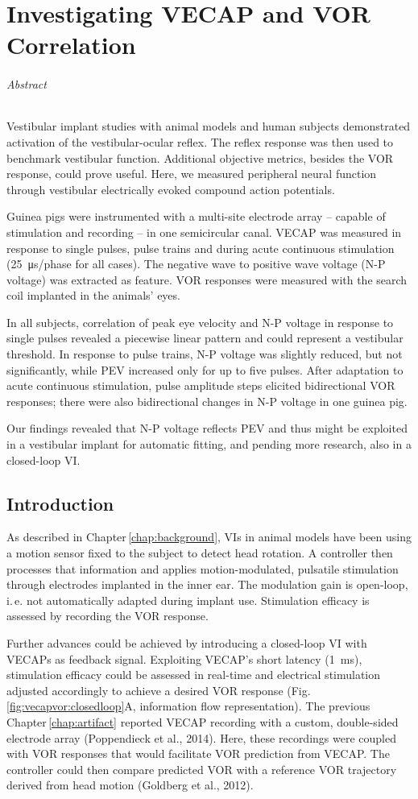 \chapter{Investigating VECAP and VOR Correlation}\label{chap:vecapvor}
\subparagraph{Abstract}
Vestibular implant studies with animal models and human subjects demonstrated activation of the vestibular-ocular reflex. The reflex response was then used to benchmark vestibular function. Additional objective metrics, besides the VOR response, could prove useful. Here, we measured peripheral neural function through vestibular electrically evoked compound action potentials. 

Guinea pigs were instrumented with a multi-site electrode array -- capable of stimulation and recording -- in one semicircular canal. VECAP was measured in response to single pulses, pulse trains and during acute continuous stimulation (\SI{25}{\micro\second}/phase for all cases). The negative wave to positive wave voltage (N-P voltage) was extracted as feature. VOR responses were measured with the search coil implanted in the animals' eyes.

In all subjects, correlation of peak eye velocity and N-P voltage in response to single pulses revealed a piecewise linear pattern and could represent a vestibular threshold. In response to pulse trains, N-P voltage was slightly reduced, but not significantly, while PEV increased only for up to five pulses. After adaptation to acute continuous stimulation, pulse amplitude steps elicited bidirectional VOR responses; there were also bidirectional changes in N-P voltage in one guinea pig.

Our findings revealed that N-P voltage reflects PEV and thus might be exploited in a vestibular implant for automatic fitting, and pending more research, also in a closed-loop VI.

\section{Introduction}
As described in Chapter\,\ref{chap:background}, VIs in animal models have been using a motion sensor fixed to the subject to detect head rotation. A controller then processes that information and applies motion-modulated, pulsatile stimulation through electrodes implanted in the inner ear. The modulation gain is open-loop, i.\,e. not automatically adapted during implant use. Stimulation efficacy is assessed by recording the VOR response.

Further advances could be achieved by introducing a closed-loop VI with VECAPs as feedback signal. Exploiting VECAP's short latency (\SI{1}{\milli\second}), stimulation efficacy could be assessed in real-time and electrical stimulation adjusted accordingly to achieve a desired VOR response (Fig.\,\ref{fig:vecapvor:closedloop}A, information flow representation). The previous Chapter\,\ref{chap:artifact} reported VECAP recording with a custom, double-sided electrode array (Poppendieck et al., 2014). Here, these recordings were coupled with VOR responses that would facilitate VOR prediction from VECAP. The controller could then compare predicted VOR with a reference VOR trajectory derived from head motion (Goldberg et al., 2012). 

